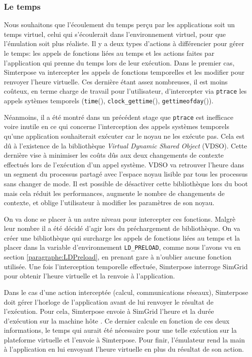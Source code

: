 \subsubsection{Le temps}

Nous souhaitons que l'écoulement du temps perçu par les applications soit un
temps virtuel, celui qui s'écoulerait dans l'environnement virtuel, pour que
l'émulation soit plus réaliste. Il y a deux types d'actions à différencier pour
gérer le temps: les appels de fonctions liées au temps et les actions faites par
l'application qui prenne du temps lors de leur exécution. Dans le premier cas,
Simterpose va intercepter les appels de fonctions temporelles et les modifier
pour renvoyer l'heure virtuelle. Ces dernière étant assez nombreuses, il est
moins coûteux, en terme charge de travail pour l'utilisateur, d'intercepter via
\texttt{ptrace} les appels sytèmes temporels (\texttt{time}(),
\texttt{clock\_gettime}(), \texttt{gettimeofday}()).

Néanmoins, il a été montré dans un précédent stage
\citep{CHLOE:Emulationapplicationdistribuees} que \texttt{ptrace} est inefficace
voire inutile en ce qui concerne l'interception des appels systèmes temporels
qu'une application souhaiterait exécuter car le noyau ne les exécute pas. Cela
est dû à l'existence de la bibliothèque \textit{Virtual Dynamic Shared Object}
(VDSO). Cette dernière vise à minimiser les coûts dûs aux deux changements de
contexte effectués lors de l'exécution d'un appel système. VDSO va retrouver
l'heure dans un segment du processus partagé avec l'espace noyau lisible par tous les processus sans changer de mode. Il est possible de désactiver cette bibliothèque lors du boot mais cela réduit les performances, augmente le nombre de changements de contexte, et oblige l'utilisateur à modifier les paramètres de son noyau.

On va donc se placer à un autre niveau pour intercepter ces fonctions. Malgrè
leur nombre il a été décidé d'agir lors du préchargement de bibliothèque. On va
créer une bibliothèque qui surcharge les appels de fonctions liées au temps et
la placer dans la variable d'environnement \texttt{LD\_PRELOAD}, comme nous
l'avons vu en section \ref{paragraphe:LDPreload}, en prenant gare à n'oublier
aucune fonction utilisée. Une fois l'interception temporelle effectuée,
Simterpose interroge SimGrid pour obtenir l'heure virtuelle et la renvoie à
l'application.

Dans le cas d'une action interceptée (calcul, communications réseaux),
Simterpose doit gérer l'horloge de l'application avant de lui renvoyer le
résultat de l'exécution. Pour cela, Simterpose envoie à SimGrid l'heure et la
durée d'exécution sur la machine hôte . Ce dernier calcule en fonction de ces
deux informations, le temps qui aurait été nécessaire pour une telle exécution
sur la plateforme virtuelle et l'envoie à Simterpose. Pour finir, l'émulateur
rend la main à l'application en lui envoyant l'heure virtuelle en plus du
résultat de son action.
